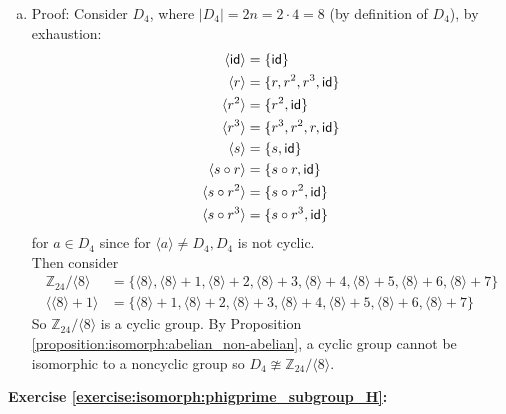 \begin{enumerate}[(a)]
\item
Proof: Consider $D_4$, where $|D_4| = 2n = 2 \cdot 4 = 8$    (by definition of $D_4$), by exhaustion:
\begin{align*}
\langle \sf{id} \rangle &= \{\sf{id}\}
\\
\langle r \rangle &= \{r, r^2, r^3, \sf{id}\}
\\
\langle r^2 \rangle &= \{r^2, \sf{id}\}
\\
\langle r^3 \rangle &= \{r^3, r^2, r, \sf{id}\}
\\
\langle s \rangle &= \{s, \sf{id}\}
\\
\langle s \circ r \rangle &= \{ s \circ r, \sf{id}\}
\\
\langle s \circ r^2 \rangle &= \{s \circ r^2, \sf{id}\}
\\
\langle s \circ r^3 \rangle &= \{s \circ r^3, \sf{id}\}
\end{align*}
for $a \in D_4$ since for $\langle a \rangle \neq D_4, D_4$ is not cyclic.
\\
Then consider 
\begin{align*}
{\mathbb Z}_{24} / \langle 8 \rangle &= \{ \langle 8 \rangle, \langle 8 \rangle + 1, \langle 8 \rangle + 2, \langle 8 \rangle + 3, \langle 8 \rangle + 4, \langle 8 \rangle + 5, \langle 8 \rangle + 6, \langle 8 \rangle + 7\}
\\
\langle \langle 8 \rangle + 1 \rangle &= \{ \langle 8 \rangle + 1, \langle 8 \rangle + 2, \langle 8 \rangle + 3, \langle 8 \rangle + 4, \langle 8 \rangle + 5, \langle 8 \rangle + 6, \langle 8 \rangle + 7\}
\end{align*}
So ${\mathbb Z}_{24} / \langle 8 \rangle$ is a cyclic group. By Proposition \ref{proposition:isomorph:abelian_non-abelian}, a cyclic group cannot be isomorphic to a noncyclic group so  $D_4 \ncong {\mathbb Z}_{24} / \langle 8 \rangle$.
\end{enumerate}

\noindent\textbf{Exercise \ref{exercise:isomorph:phigprime_subgroup_H}:}

